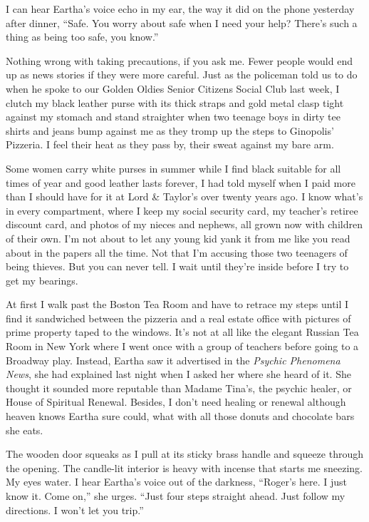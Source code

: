 \documentclass[
]{article}
\begin{document}
I can hear Eartha's voice echo in my ear, the way it did on the phone
yesterday after dinner, ``Safe. You worry about safe when I need your
help? There's such a thing as being too safe, you know.''

Nothing wrong with taking precautions, if you ask me. Fewer people would
end up as news stories if they were more careful. Just as the policeman
told us to do when he spoke to our Golden Oldies Senior Citizens Social
Club last week, I clutch my black leather purse with its thick straps
and gold metal clasp tight against my stomach and stand straighter when
two teenage boys in dirty tee shirts and jeans bump against me as they
tromp up the steps to Ginopolis' Pizzeria. I feel their heat as they
pass by, their sweat against my bare arm.

Some women carry white purses in summer while I find black suitable for
all times of year and good leather lasts forever, I had told myself when
I paid more than I should have for it at Lord \& Taylor's over twenty
years ago. I know what's in every compartment, where I keep my social
security card, my teacher's retiree discount card, and photos of my
nieces and nephews, all grown now with children of their own. I'm not
about to let any young kid yank it from me like you read about in the
papers all the time. Not that I'm accusing those two teenagers of being
thieves. But you can never tell. I wait until they're inside before I
try to get my bearings.

At first I walk past the Boston Tea Room and have to retrace my steps
until I find it sand­wiched between the pizzeria and a real estate
office with pictures of prime property taped to the win­dows. It's not
at all like the elegant Russian Tea Room in New York where I went once
with a group of teachers before going to a Broadway play. Instead,
Eartha saw it advertised in the \emph{Psychic Phenomena News}, she had
explained last night when I asked her where she heard of it. She thought
it sounded more reputable than Madame Tina's, the psychic healer, or
House of Spiritual Renewal. Besides, I don't need healing or renewal
although heaven knows Eartha sure could, what with all those donuts and
chocolate bars she eats.

The wooden door squeaks as I pull at its sticky brass handle and squeeze
through the opening. The candle-lit interior is heavy with incense that
starts me sneezing. My eyes water. I hear Eartha's voice out of the
darkness, ``Roger's here. I just know it. Come on,'' she urges. ``Just
four steps straight ahead. Just follow my directions. I won't let you
trip.''
\end{document}
